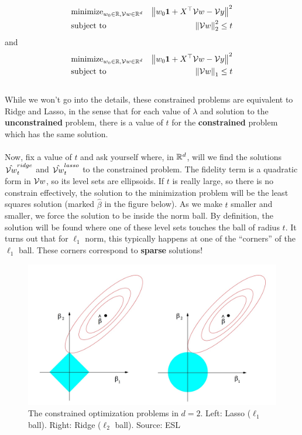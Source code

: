  \begin{eqnarray*}
  & \text{minimize}_{w_0\in\mathbb{R},\mathcal{V}{w}\in\mathbb{R}^{d}}   &  \left\|   w_0\mathbf{1} + X^{\top}\mathcal{V}{w} -\mathcal{V}{y}  \right\|^2 \\
      & \text{subject to} &  \left\| \mathcal{V}{w}\right\|_2^2 \leq t
    \end{eqnarray*}
    and
     \begin{eqnarray*}
  & \text{minimize}_{w_0\in\mathbb{R},\mathcal{V}{w}\in\mathbb{R}^{d}}   &  \left\|   w_0\mathbf{1} + X^{\top}\mathcal{V}{w} -\mathcal{V}{y}  \right\|^2 \\
      & \text{subject to} &  \left\| \mathcal{V}{w}\right\|_1 \leq t
    \end{eqnarray*}
~\\
    While we won't go into the details, these constrained problems are
    equivalent to Ridge and Lasso, in the sense that for each value of $\lambda$
    and solution to the {\bf unconstrained} problem, there is a value of $t$ for
    the {\bf constrained} problem which has the same solution.
 \\~\\
    Now, fix a value of $t$ and ask yourself where, in $\mathbb{R}^d$, will we find the
    solutions $\hat{\mathcal{V}{w}}^{ridge}_t$ and $\hat{\mathcal{V}{w}}^{lasso}_t$ 
    to the constrained problem. The fidelity term is a quadratic form
    in $\mathcal{V}{w}$, so its level sets are ellipsoids.
    If $t$ is really large, so there is no constrain effectively, the solution
    to the minimization problem will be the least squares solution (marked
    $\hat{\beta}$ in the figure below). As we make $t$ smaller and smaller, we
    force the solution to be inside the norm ball.
    By definition, the 
    solution will be found where one of these level sets touches the ball of
    radius $t$. It turns out that for $\ell_1$ norm, this typically happens at
    one of the ``corners'' of the $\ell_1$ ball. These corners correspond to
    {\bf sparse} solutions!

     \begin{figure}[H]
      \centering
      \includegraphics[width=5in]{l1_l2_balls.jpeg}
      \caption{The constrained optimization problems in $d=2$. Left: Lasso
        ($\ell_1$ ball). Right: Ridge ($\ell_2$ ball).
      Source: ESL}
    \end{figure}


